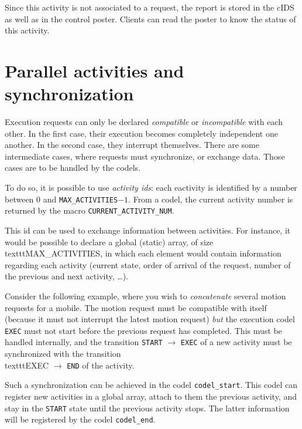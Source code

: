 Since this activity is not associated to a  request, the report is stored
in the cIDS as well as in the control poster. Clients can read the poster
to know the status of this activity.


\section{Parallel activities and synchronization}

Execution   requests can  only  be  declared  \emph{compatible} or  {\em
incompatible} with each other. In the first case, their execution becomes
completely  independent one another.  In  the second case, they interrupt
themselves.  There are  some   intermediate  cases, where  requests  must
synchronize, or exchange  data.   Those cases are  to  be handled  by the
codels.

To  do so, it is  possible to use \emph{activity  ids}: each eactivity is
identified by a number between  $0$ and \texttt{MAX\_ACTIVITIES}$-1$. From a
codel,   the current  activity number  is    returned by the  macro  
\texttt{CURRENT\_ACTIVITY\_NUM}.

This  id can be  used  to exchange   information between activities.  For
instance, it would  be possible to  declare  a global (static) array,  of
size \\texttt{MAX\_ACTIVITIES},    in which   each  element   would  contain
information regarding each activity  (current state, order of  arrival of
the request, number of the previous and next activity, \ldots).

Consider  the following  example,  where  you wish  to \emph{concatenate}
several motion  requests  for a   mobile.  The  motion  request  must  be
compatible with  itself (because it must not  interrupt the latest motion
request)  \emph{but} the execution codel  \texttt{EXEC} must not start before
the previous request has completed.  This must be handled internally, and
the  transition \texttt{START}  $\rightarrow$  \texttt{EXEC}  of a new activity
must be  synchronized with the  transition \\texttt{EXEC} $\rightarrow$ 
\texttt{END} of the activity.

Such  a  synchronization     can  be  achieved   in     the   codel  
\texttt{codel\_start}. This codel can register new activities in a global
array, attach to them the previous activity, and  stay in the \texttt{START}
state  until the previous activity  stops. The latter information will be
registered by the codel \texttt{codel\_end}.

